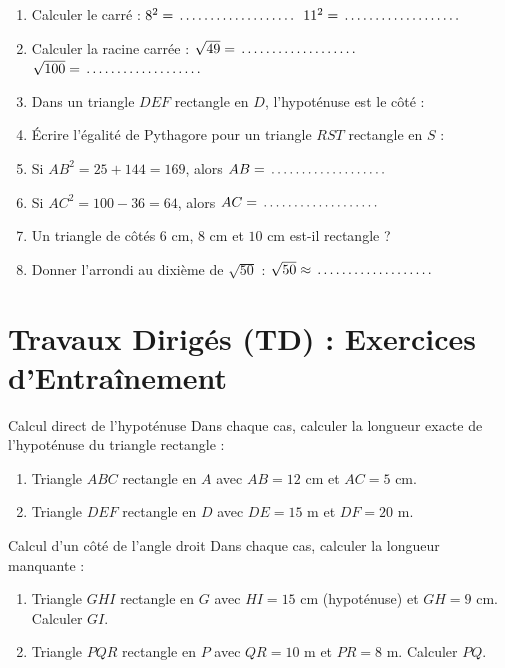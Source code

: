 \begin{automatisme}
\begin{enumerate}[label=\textbf{Q\arabic*.}]
    \item Calculer le carré : $8^2 = \pointille[3cm]$ \hfill $11^2 = \pointille[3cm]$
    \item Calculer la racine carrée : $\sqrt{49} = \pointille[3cm]$ \hfill $\sqrt{100} = \pointille[3cm]$
    \item Dans un triangle $DEF$ rectangle en $D$, l'hypoténuse est le côté : \pointille[3cm]
    \item Écrire l'égalité de Pythagore pour un triangle $RST$ rectangle en $S$ : \pointille[4cm]
    \item Si $AB^2 = 25 + 144 = 169$, alors $AB = \pointille[3cm]$
    \item Si $AC^2 = 100 - 36 = 64$, alors $AC = \pointille[3cm]$
    \item Un triangle de côtés $6\text{ cm}$, $8\text{ cm}$ et $10\text{ cm}$ est-il rectangle ? \pointille[3cm]
    \item Donner l'arrondi au dixième de $\sqrt{50}$ : $\sqrt{50} \approx \pointille[3cm]$
\end{enumerate}
\end{automatisme}

\section{Travaux Dirigés (TD) : Exercices d'Entraînement}

\begin{exercice}[2 pts]{\capRealiser}{Calcul direct de l'hypoténuse}
Dans chaque cas, calculer la longueur exacte de l'hypoténuse du triangle rectangle :
\begin{enumerate}
    \item Triangle $ABC$ rectangle en $A$ avec $AB = 12\text{ cm}$ et $AC = 5\text{ cm}$.
    \item Triangle $DEF$ rectangle en $D$ avec $DE = 15\text{ m}$ et $DF = 20\text{ m}$.
\end{enumerate}
\lignesreponse[4]
\end{exercice}

\begin{exercice}[3 pts]{\capRealiser}{Calcul d'un côté de l'angle droit}
Dans chaque cas, calculer la longueur manquante :
\begin{enumerate}
    \item Triangle $GHI$ rectangle en $G$ avec $HI = 15\text{ cm}$ (hypoténuse) et $GH = 9\text{ cm}$. Calculer $GI$.
    \item Triangle $PQR$ rectangle en $P$ avec $QR = 10\text{ m}$ et $PR = 8\text{ m}$. Calculer $PQ$.
\end{enumerate}
\lignesreponse[4]
\end{exercice}

